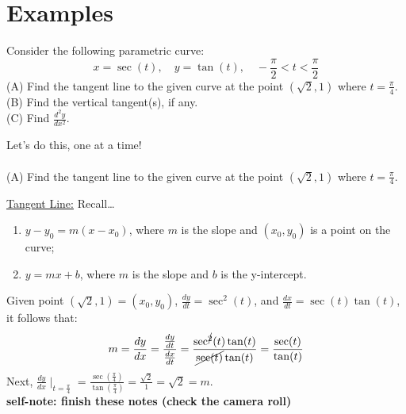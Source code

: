 \documentclass{article}
\begin{document}
\section*{Examples}
\begin{examplebox}
Consider the following parametric curve:
\[
    x = \sec(t), \quad y = \tan(t), \quad -\frac{\pi}{2} < t < \frac{\pi}{2}
\]
(A) Find the tangent line to the given curve at the point \( (\sqrt{2}, 1) \) where \( t = \frac{\pi}{4} \). \\
(B) Find the vertical tangent(s), if any. \\
(C) Find \( \frac{d^2y}{dx^2} \).
\end{examplebox}
Let's do this, one at a time! \\
\\
(A) Find the tangent line to the given curve at the point \( (\sqrt{2}, 1) \) where \( t = \frac{\pi}{4} \).
\begin{examplebox}
\underline{Tangent Line:}
Recall\dots
\begin{enumerate}
    \item \( y - y_0 = m(x - x_0) \), where \( m \) is the slope and \( (x_0, y_0) \) is a point on the curve;
    \item \( y = mx + b \), where \( m \) is the slope and \( b \) is the y-intercept.
\end{enumerate}
Given point \( (\sqrt{2}, 1) = (x_0, y_0) \), \( \frac{dy}{dt} = \sec^2(t) \), and \( \frac{dx}{dt} = \sec(t)\tan(t) \), it follows that:
\[
    m = \frac{dy}{dx} = \frac{\frac{dy}{dt}}{\frac{dx}{dt}} = \frac{\sec^{\cancel{2}}(t)\tan(t)}{\cancel{\sec(t)}\tan(t)} = \frac{\sec(t)}{\tan(t)}
\]
Next, \( \frac{dy}{dx} \mid_{t = \frac{\pi}{4}} = \frac{\sec(\frac{\pi}{4})}{\tan(\frac{\pi}{4})} = \frac{\sqrt{2}}{1} = \sqrt{2} = m \). \\

\textbf{self-note: finish these notes (check the camera roll)}

\end{examplebox}
\end{document}
